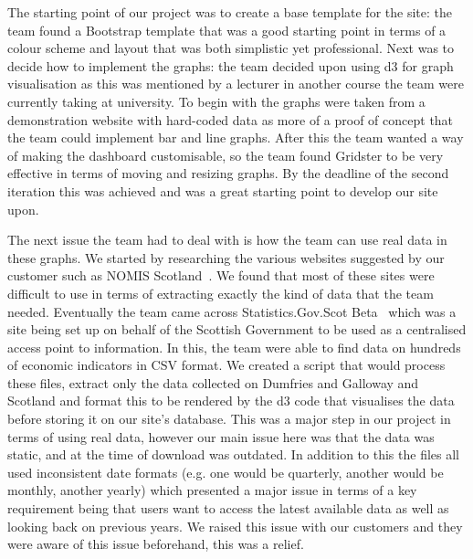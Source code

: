 \documentclass{l3proj}
\begin{document}
The starting point of our project was to create a base template for the site: the team found a Bootstrap template that was a good starting
point in terms of a colour scheme and layout that was both simplistic yet professional. Next was to decide how to implement the
graphs: the team decided upon using d3 for graph visualisation as this was mentioned by a lecturer in another course the team were currently
taking at university. To begin with the graphs were taken from a demonstration website with hard-coded data as more of a proof
of concept that the team could implement bar and line graphs. After this the team wanted a way of making the dashboard customisable, so the team
found Gridster to be very effective in terms of moving and resizing graphs. By the deadline of the second iteration this was
achieved and was a great starting point to develop our site upon.

The next issue the team had to deal with is how the team can use real data in these graphs. We started by researching the various websites
suggested by our customer such as NOMIS Scotland~\cite{NOMISScot}. We found that most of these sites were difficult to use in terms of extracting
exactly the kind of data that the team needed. Eventually the team came across Statistics.Gov.Scot Beta~\cite{StatisticsScotBeta} which was a site being set up on behalf of
the Scottish Government to be used as a centralised access point to information. In this, the team were able to find data on
hundreds of economic indicators in CSV format. We created a script that would process these files, extract only the data collected
on Dumfries and Galloway and Scotland and format this to be rendered by the d3 code that visualises the data before storing it on
our site's database. This was a major step in our project in terms of using real data, however our main issue here was that the
data was static, and at the time of download was outdated. In addition to this the files all used inconsistent date formats (e.g.
one would be quarterly, another would be monthly, another yearly) which presented a major issue in terms of a key requirement
being that users want to access the latest available data as well as looking back on previous years. We raised this issue
with our customers and they were aware of this issue beforehand, this was a relief.
\end{document}
